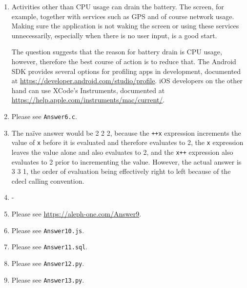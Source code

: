 \documentclass{article}
\begin{document}
\begin{enumerate}[start=0]
\item Activities other than CPU usage can drain the battery. The screen, for example, together with services such as GPS and of course network usage. Making sure the application is not waking the screen or using these services unnecessarily, especially when there is no user input, is a good start.

The question suggests that the reason for battery drain is CPU usage, however, therefore the best course of action is to reduce that. The Android SDK provides several options for profiling apps in development, documented at \url{https://developer.android.com/studio/profile}. iOS developers on the other hand can use XCode's Instruments, documented at \url{https://help.apple.com/instruments/mac/current/}.

\item Please see \texttt{Answer6.c}.

\item The na\"{i}ve answer would be 2 2 2, because the \texttt{++x} expression increments the value of \texttt{x} before it is evaluated and therefore evaluates to 2, the \texttt{x} expression leaves the value alone and also evaluates to 2, and the \texttt{x++} expression also evaluates to 2 prior to incrementing the value. However, the actual answer is 3 3 1, the order of evaluation being effectively right to left because of the cdecl calling convention.

\item -

\item Please see \url{https://aleph-one.com/Answer9}.

\item Please see \texttt{Answer10.js}.

\item Please see \texttt{Answer11.sql}. 

\item Please see \texttt{Answer12.py}. 

\item Please see \texttt{Answer13.py}. 

\end{enumerate}
\end{document}
